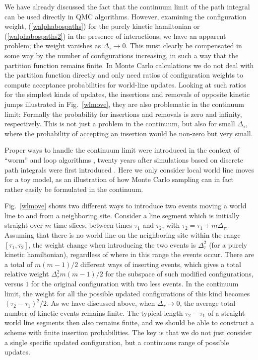 \documentclass[draft,numberedheadings]{aipproc}
\begin{document}
We have already discussed the fact that the continuum limit of the path integral can be used directly in QMC algorithms. However, examining the 
configuration weight, (\ref{walphabospaths}) for the purely kinetic hamiltonian or (\ref{walphabospaths2}) in the presence of interactions, we have an apparent 
problem; the weight vanishes as $\Delta_\tau \to 0$. This must clearly be compensated in some way by the number of configurations increasing, in such a way that the 
partition function remains finite. In Monte Carlo calculations we do not deal with the partition function directly and only need ratios of configuration weights to 
compute acceptance probabilities for world-line updates. Looking at such ratios for the simplest kinds of updates, the insertions and removals of opposite kinetic 
jumps illustrated in Fig.~\ref{wlmove}, they are also problematic in the continuum limit: Formally the probability for insertions and removals is zero and infinity, 
respectively. This is not just a problem in the continuum, but also for small $\Delta_\tau$, where the probability of accepting an insertion would be non-zero 
but very small. 

Proper ways to handle the continuum limit were introduced in the context of ``worm'' \cite{prokofev96}  and loop algorithms \cite{beard}, twenty years after 
simulations based on discrete path integrals were first introduced \cite{suzuki76,suzuki77}. Here we only consider local world line moves for a toy model, as an 
illustration of how Monte Carlo sampling can in fact rather easily be formulated in the continuum.

Fig.~\ref{wlmove} shows two different ways to introduce two events moving a world line to and from a neighboring site. Consider a line segment which is initially 
straight over $m$ time slices, between times $\tau_1$ and $\tau_2$, with $\tau_2=\tau_1+m\Delta_\tau$. Assuming that there is no world line on the neighboring site
within the range $[\tau_1,\tau_2]$, the weight change when introducing the two events is $\Delta_\tau^2$ (for a purely kinetic hamiltonian), regardless of where 
in this range the events occur. There are a total of $m(m-1)/2$ different ways of inserting events, which gives a total relative weight $\Delta_\tau^2m(m-1)/2$ for 
the subspace of such modified configurations, versus $1$ for the original configuration with two less events. In the continuum limit, the weight for all the 
possible updated configurations of this kind becomes $(\tau_2-\tau_1)^2/2$. As we have discussed above, when $\Delta_\tau \to 0$, the average total number of kinetic 
events remains finite. The typical length $\tau_2-\tau_1$ of a straight world line segments then also remains finite, and we should be able to construct a scheme 
with finite insertion probabilities. The key is that we do not just consider a single specific updated configuration, but a continuous range of possible 
updates.
\end{document}
